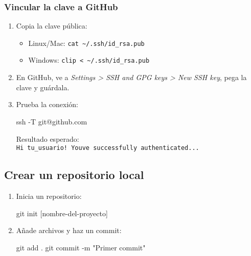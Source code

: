 \documentclass[
  doc,
  floatsintext,
  longtable,
  a4paper,
  nolmodern,
  notxfonts,
  notimes,
  colorlinks=true,linkcolor=blue,citecolor=blue,urlcolor=blue]{apa7}
\newenvironment{Shaded}{\begin{snugshade}}{\end{snugshade}}
\newcommand{\AttributeTok}[1]{\textcolor[rgb]{0.40,0.45,0.13}{#1}}
\newcommand{\FunctionTok}[1]{\textcolor[rgb]{0.28,0.35,0.67}{#1}}
\newcommand{\NormalTok}[1]{\textcolor[rgb]{0.00,0.23,0.31}{#1}}
\newcommand{\PreprocessorTok}[1]{\textcolor[rgb]{0.68,0.00,0.00}{#1}}
\newcommand{\SpecialStringTok}[1]{\textcolor[rgb]{0.13,0.47,0.30}{#1}}
\newcommand{\StringTok}[1]{\textcolor[rgb]{0.13,0.47,0.30}{#1}}
\providecommand{\tightlist}{%
  \setlength{\itemsep}{0pt}\setlength{\parskip}{0pt}}
\begin{document}
\subsubsection{Vincular la clave a
GitHub}\label{vincular-la-clave-a-github}

\begin{enumerate}
\def\labelenumi{\arabic{enumi}.}
\item
  Copia la clave pública:

  \begin{itemize}
  \tightlist
  \item
    Linux/Mac: \texttt{cat\ \textasciitilde{}/.ssh/id\_rsa.pub}
  \item
    Windows:
    \texttt{clip\ \textless{}\ \textasciitilde{}/.ssh/id\_rsa.pub}
  \end{itemize}
\item
  En GitHub, ve a \emph{Settings \textgreater{} SSH and GPG keys
  \textgreater{} New SSH key}, pega la clave y guárdala.
\item
  Prueba la conexión:

\begin{Shaded}
\begin{Highlighting}[]
\FunctionTok{ssh} \AttributeTok{{-}T}\NormalTok{ git@github.com}
\end{Highlighting}
\end{Shaded}

  Resultado esperado:
  \texttt{Hi\ tu\_usuario!\ You\textquotesingle{}ve\ successfully\ authenticated...}
\end{enumerate}

\subsection{Crear un repositorio
local}\label{crear-un-repositorio-local}

\begin{enumerate}
\def\labelenumi{\arabic{enumi}.}
\item
  Inicia un repositorio:

\begin{Shaded}
\begin{Highlighting}[]
\FunctionTok{git}\NormalTok{ init }\PreprocessorTok{[}\SpecialStringTok{nombre}\PreprocessorTok{{-}}\SpecialStringTok{del}\PreprocessorTok{{-}}\SpecialStringTok{proyecto}\PreprocessorTok{]}
\end{Highlighting}
\end{Shaded}
\item
  Añade archivos y haz un commit:

\begin{Shaded}
\begin{Highlighting}[]
\FunctionTok{git}\NormalTok{ add .}
\FunctionTok{git}\NormalTok{ commit }\AttributeTok{{-}m} \StringTok{"Primer commit"}
\end{Highlighting}
\end{Shaded}
\end{enumerate}
\end{document}
